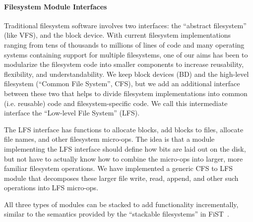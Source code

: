 \paragraph{Filesystem Module Interfaces}
\label{sec:interfaces}

Traditional filesystem software involves two interfaces: the ``abstract
filesystem'' (like VFS), and the block device. With current filesystem
implementations ranging from tens of thousands to millions of lines of code and
many operating systems containing support for multiple filesystems, one of our
aims has been to modularize the filesystem code into smaller components to
increase reusability, flexibility, and understandability. We keep block devices
(BD) and the high-level filesystem (``Common File System'', CFS), but we add an
additional interface between these two that helps to divide filesystem
implementations into common (i.e. reusable) code and filesystem-specific code.
We call this intermediate interface the ``Low-level File System'' (LFS).

The LFS interface has functions to allocate blocks, add blocks to
files, allocate file names, and other filesystem micro-ops. The idea
is that a module implementing the LFS interface should define how bits
are laid out on the disk, but not have to actually know how to combine
the micro-ops into larger, more familiar filesystem operations. We
have implemented a generic CFS to LFS module that decomposes these
larger file write, read, append, and other such operations into LFS
micro-ops.

All three types of modules can be stacked to add functionality incrementally,
similar to the semantics provided by the ``stackable filesystems'' in
FiST~\cite{zadok00fist}.
